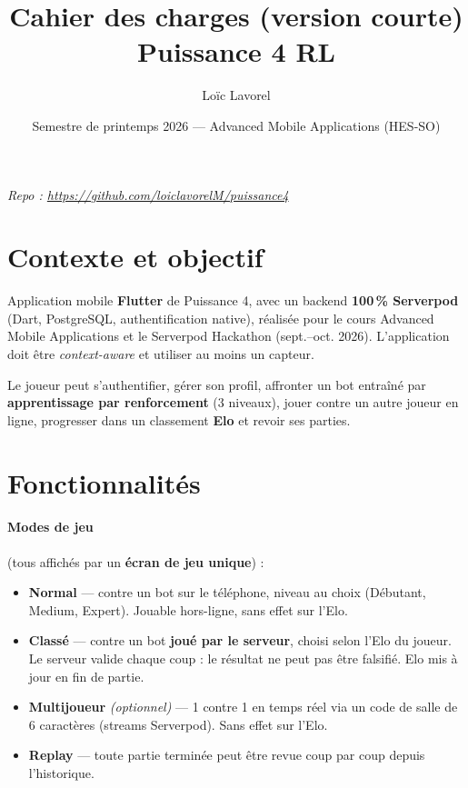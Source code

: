 \documentclass[a4paper,11pt]{article}
\title{\textbf{Cahier des charges (version courte)} \\[4pt] \Large Puissance 4 RL}
\author{Loïc Lavorel}
\date{Semestre de printemps 2026 --- Advanced Mobile Applications (HES-SO)}
\begin{document}
\maketitle

\begin{center}
\textit{Repo : \url{https://github.com/loiclavorelM/puissance4}}
\end{center}

\section{Contexte et objectif}

Application mobile \textbf{Flutter} de Puissance 4, avec un backend
\textbf{100\,\% Serverpod} (Dart, PostgreSQL, authentification native), réalisée pour le
cours Advanced Mobile Applications et le Serverpod Hackathon (sept.--oct. 2026).
L'application doit être \textit{context-aware} et utiliser au moins un capteur.

Le joueur peut s'authentifier, gérer son profil, affronter un bot entraîné par
\textbf{apprentissage par renforcement} (3 niveaux), jouer contre un autre joueur en
ligne, progresser dans un classement \textbf{Elo} et revoir ses parties.

\section{Fonctionnalités}

\paragraph{Modes de jeu} (tous affichés par un \textbf{écran de jeu unique}) :
\begin{itemize}
  \item \textbf{Normal} --- contre un bot sur le téléphone, niveau au choix
        (Débutant, Medium, Expert). Jouable hors-ligne, sans effet sur l'Elo.
  \item \textbf{Classé} --- contre un bot \textbf{joué par le serveur}, choisi selon
        l'Elo du joueur. Le serveur valide chaque coup : le résultat ne peut pas être
        falsifié. Elo mis à jour en fin de partie.
  \item \textbf{Multijoueur} \textit{(optionnel)} --- 1 contre 1 en temps réel via un
        code de salle de 6 caractères (streams Serverpod). Sans effet sur l'Elo.
  \item \textbf{Replay} --- toute partie terminée peut être revue coup par coup depuis
        l'historique.
\end{itemize}
\end{document}
